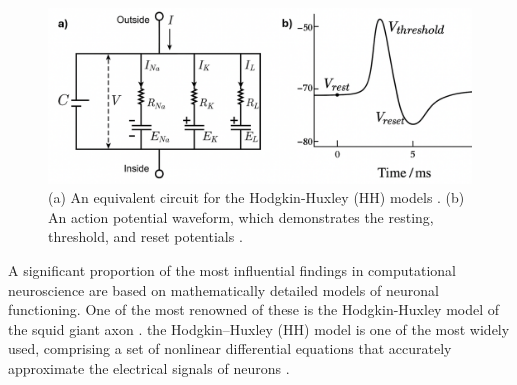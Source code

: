 

\begin{figure}[htbp!] 
    \centering    
    \includegraphics[width=1\textwidth]{Chapter2/Figs/c.png}
    \caption[Hodgkin-Huxley neuron model.]{(a) An equivalent circuit for the Hodgkin-Huxley (HH) models \cite{hodgkin1952quantitative}. (b) An action potential waveform, which demonstrates the resting, threshold, and reset potentials \cite{chua2012hodgkin}.}
    \label{fig:2c}
\end{figure}


\noindent A significant proportion of the most influential findings in computational neuroscience are based on mathematically detailed models of neuronal functioning. One of the most renowned of these is the Hodgkin-Huxley model of the squid giant axon \cite{hodgkin1952quantitative}. the Hodgkin–Huxley (HH) model is one of the most widely used, comprising a set of nonlinear differential equations that accurately approximate the electrical signals of neurons \cite{chua2012hodgkin}. \\


